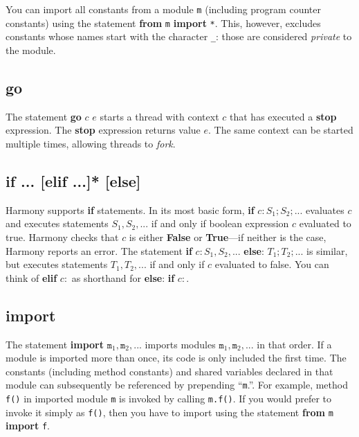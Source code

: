 \documentclass{report}
\begin{document}
You can import all constants from a module \texttt{m}
(including program counter constants) using the statement
\textbf{from} \texttt{m} \textbf{import} \texttt{*}.
This, however, excludes constants whose names start with the character
\texttt{\_}: those are considered \emph{private} to the module.

\subsection*{\textbf{go}}

The statement \textbf{go} $c$ $e$ starts a thread with context $c$ that
has executed a \textbf{stop} expression.  The \textbf{stop} expression
returns value $e$.
The same context can be started multiple times, allowing threads to
\emph{fork}.

\subsection*{\textbf{if ... [elif ...]* [else]}}

Harmony supports \textbf{if} statements.
In its most basic form, \textbf{if} $c: S_1; S_2; ...$ evaluates $c$
and executes statements $S_1, S_2, ...$ if and only if boolean expression
$c$ evaluated to true.
Harmony checks that $c$ is either \textbf{False} or \textbf{True}---if neither
is the case, Harmony reports an error.
The statement \textbf{if} $c: S_1, S_2, ...$ \textbf{else}:
$T_1; T_2; ...$ is similar, but executes statements $T_1, T_2, ...$
if and only if $c$ evaluated to false.
You can think of \textbf{elif} $c:$ as shorthand for
\textbf{else}: \textbf{if} $c:$.

\subsection*{\textbf{import}}

The statement \textbf{import} $\mathtt{m}_1, \mathtt{m}_2, ...$ imports modules
$\mathtt{m}_1, \mathtt{m}_2, ...$ in that order.
If a module is imported more than once,
its code is only included the first time.
The constants (including method constants) and shared variables declared 
in that module can subsequently be referenced by prepending ``\texttt{m}.''.
For example, method \texttt{f()} in imported module \texttt{m} is invoked
by calling \texttt{m.f()}.  If you would prefer to invoke it simply as
\texttt{f()}, then you have to import using the statement
\textbf{from} \texttt{m} \textbf{import} \texttt{f}.
\end{document}
